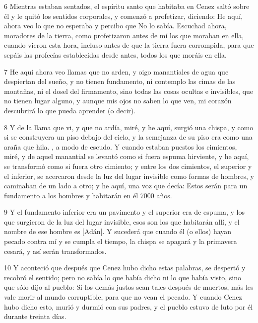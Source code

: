 \par 6 Mientras estaban sentados, el espíritu santo que habitaba en Cenez saltó sobre él y le quitó los sentidos corporales, y comenzó a profetizar, diciendo: He aquí, ahora veo lo que no esperaba y percibo que No lo sabía. Escuchad ahora, moradores de la tierra, como profetizaron antes de mí los que moraban en ella, cuando vieron esta hora, incluso antes de que la tierra fuera corrompida, para que sepáis las profecías establecidas desde antes, todos los que moráis en ella.

\par 7 He aquí ahora veo llamas que no arden, y oigo manantiales de agua que despiertan del sueño, y no tienen fundamento, ni contemplo las cimas de las montañas, ni el dosel del firmamento, sino todas las cosas ocultas e invisibles, que no tienen lugar alguno, y aunque mis ojos no saben lo que ven, mi corazón descubrirá lo que pueda aprender (o decir).

\par 8 Y de la llama que vi, y que no ardía, miré, y he aquí, surgió una chispa, y como si se construyera un piso debajo del cielo, y la semejanza de su piso era como una araña que hila. , a modo de escudo. Y cuando estaban puestos los cimientos, miré, y de aquel manantial se levantó como si fuera espuma hirviente, y he aquí, se transformó como si fuera otro cimiento; y entre los dos cimientos, el superior y el inferior, se acercaron desde la luz del lugar invisible como formas de hombres, y caminaban de un lado a otro; y he aquí, una voz que decía: Estos serán para un fundamento a los hombres y habitarán en él 7000 años.

\par 9 Y el fundamento inferior era un pavimento y el superior era de espuma, y ​​los que surgieron de la luz del lugar invisible, esos son los que habitarán allí, y el nombre de ese hombre es [Adán]. Y sucederá que cuando él (o ellos) hayan pecado contra mí y se cumpla el tiempo, la chispa se apagará y la primavera cesará, y así serán transformados.

\par 10 Y aconteció que después que Cenez hubo dicho estas palabras, se despertó y recobró el sentido; pero no sabía lo que había dicho ni lo que había visto, sino que sólo dijo al pueblo: Si los demás justos sean tales después de muertos, más les vale morir al mundo corruptible, para que no vean el pecado. Y cuando Cenez hubo dicho esto, murió y durmió con sus padres, y el pueblo estuvo de luto por él durante treinta días.



